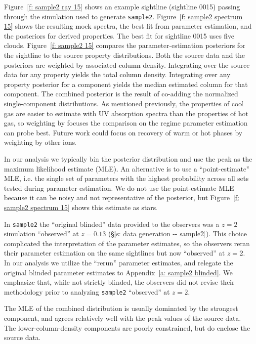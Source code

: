 \documentclass[fleqn,usenatbib]{mnras}
\begin{document}
Figure~\ref{f: sample2 ray 15} shows an example sightline (sightline 0015) passing through the simulation used to generate \texttt{sample2}.
Figure~\ref{f: sample2 spectrum 15} shows the resulting mock spectra,
the best fit from parameter estimation,
and the posteriors for derived properties.
The best fit for sightline 0015 uses five clouds.
Figure~\ref{f: sample2 15} compares the parameter-estimation posteriors for the sightline to the source property distributions.
Both the source data and the posteriors are weighted by associated  column density.
Integrating over the source data for any property yields the total  column density.
Integrating over any property posterior for a component yields the median estimated  column for that component.
The combined posterior is the result of co-adding the normalized single-component distributions.
As mentioned previously, the properties of cool gas are easier to estimate with UV absorption spectra than the properties of hot gas,
so weighting by  focuses the comparison on the regime parameter estimation can probe best.
Future work could focus on recovery of warm or hot phases by weighting by other ions.

In our analysis we typically bin the posterior distribution and use the peak as the maximum likelihood estimate (MLE).
An alternative is to use a ``point-estimate'' MLE, i.e. the single set of parameters with the highest probability across all sets tested during parameter estimation.
We do not use the point-estimate MLE because it can be noisy and not representative of the posterior, but Figure~\ref{f: sample2 spectrum 15} shows this estimate as stars.

In \texttt{sample2} the ``original blinded'' data provided to the observers was a $z=2$ simulation ``observed'' at $z=0.13$ (\S\ref{s: data generation -- sample2}).
This choice complicated the interpretation of the parameter estimates,
so the observers reran their parameter estimation on the same sightlines but now ``observed'' at $z=2$.
In our analysis we utilize the ``rerun'' parameter estimates,
and relegate the original blinded parameter estimates to Appendix~\ref{a: sample2 blinded}.
We emphasize that, while not strictly blinded, the observers did not revise their methodology prior to analyzing \texttt{sample2} ``observed'' at $z=2$.

The MLE of the combined distribution is usually dominated by the strongest component,
and agrees relatively well with the peak values of the source data.
The lower-column-density components are poorly constrained, but do enclose the source data.
\end{document}
